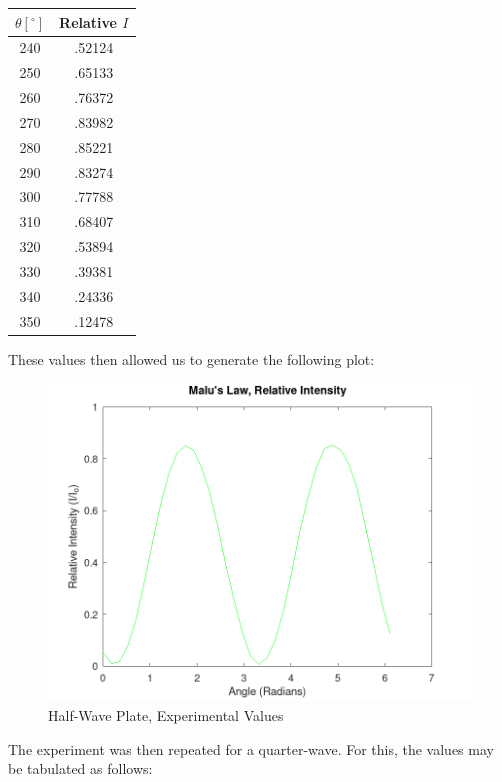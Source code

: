 \documentclass[
	letterpaper, %
	10pt, %
]{CSUniSchoolLabReport}
\begin{document}
\begin{multicols}{3}
\begin{center}
  \begin{tabular}[H]{|c|c|}
    \hline
    $\theta[^{\circ}]$ & Relative $I$\\
    \hline
    240 & .52124\\
    \hline
    250 & .65133\\
    \hline
    260 & .76372\\
    \hline
    270 & .83982\\
    \hline
    280 & .85221\\
    \hline
    290 & .83274\\
    \hline
    300 & .77788\\
    \hline
    310 & .68407\\
    \hline
    320 & .53894\\
    \hline
    330 & .39381\\
    \hline
    340 & .24336\\
    \hline
    350 & .12478\\
    \hline
  \end{tabular}
\end{center}

\end{multicols}

These values then allowed us to generate the following plot:

\begin{figure}[H]
  \centering
  \includegraphics[width=.9\textwidth]{Figures/Lab Eight/Half-Wave.png}
  \caption{Half-Wave Plate, Experimental Values}
  \label{fig:2}
\end{figure}

The experiment was then repeated for a quarter-wave. For this, the values may be tabulated as follows:
\end{document}
